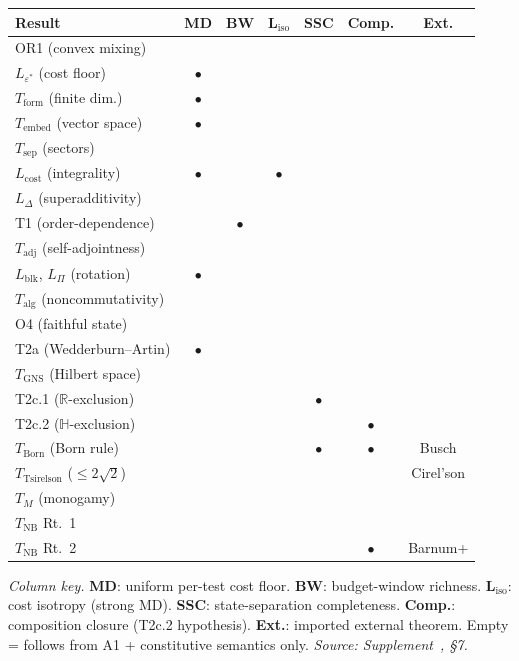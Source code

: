 \documentclass[11pt]{article}
\begin{document}
\smallskip
\begin{center}\small
\renewcommand{\arraystretch}{1.05}
\begin{tabular}{@{}lcccccc@{}}
\toprule
\textbf{Result} & \textbf{MD} & \textbf{BW} & $\boldsymbol{L_{\mathrm{iso}}}$ & \textbf{SSC} & \textbf{Comp.} & \textbf{Ext.} \\
\midrule
OR1 (convex mixing) & & & & & & \\
$L_{\varepsilon^*}$ (cost floor) & $\bullet$ & & & & & \\
$T_{\mathrm{form}}$ (finite dim.) & $\bullet$ & & & & & \\
$T_{\mathrm{embed}}$ (vector space) & $\bullet$ & & & & & \\
$T_{\mathrm{sep}}$ (sectors) & & & & & & \\
$L_{\mathrm{cost}}$ (integrality) & $\bullet$ & & $\bullet$ & & & \\
$L_\Delta$ (superadditivity) & & & & & & \\
T1 (order-dependence) & & $\bullet$ & & & & \\
$T_{\mathrm{adj}}$ (self-adjointness) & & & & & & \\
$L_{\mathrm{blk}}$, $L_\Pi$ (rotation) & $\bullet$ & & & & & \\
$T_{\mathrm{alg}}$ (noncommutativity) & & & & & & \\
O4 (faithful state) & & & & & & \\
T2a (Wedderburn--Artin) & $\bullet$ & & & & & \\
$T_{\mathrm{GNS}}$ (Hilbert space) & & & & & & \\
T2c.1 ($\mathbb{R}$-exclusion) & & & & $\bullet$ & & \\
T2c.2 ($\mathbb{H}$-exclusion) & & & & & $\bullet$ & \\
$T_{\mathrm{Born}}$ (Born rule) & & & & $\bullet$ & $\bullet$ & Busch \\
$T_{\mathrm{Tsirelson}}$ ($\le 2\sqrt{2}$) & & & & & & Cirel'son \\
$T_M$ (monogamy) & & & & & & \\
$T_{\mathrm{NB}}$ Rt.~1 & & & & & & \\
$T_{\mathrm{NB}}$ Rt.~2 & & & & & $\bullet$ & Barnum+ \\
\bottomrule
\end{tabular}
\end{center}

\noindent\textit{Column key.}  \textbf{MD}: uniform per-test cost floor.  \textbf{BW}: budget-window richness.  $\boldsymbol{L_{\mathrm{iso}}}$: cost isotropy (strong MD).  \textbf{SSC}: state-separation completeness.  \textbf{Comp.}: composition closure (T2c.2 hypothesis).  \textbf{Ext.}: imported external theorem.  Empty = follows from A1 + constitutive semantics only.  \textit{Source: Supplement~\cite{Supp}, §7.}
\end{document}
